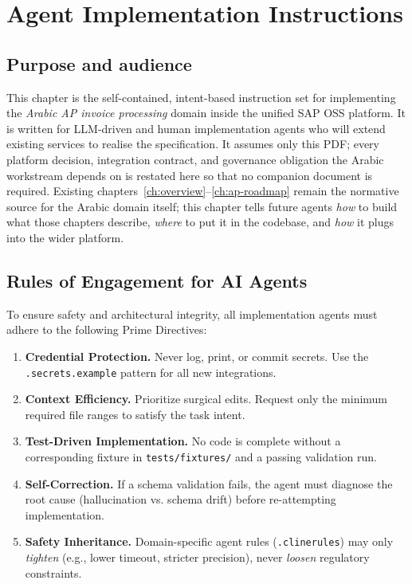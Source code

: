 \documentclass[11pt,a4paper,twoside]{report}
\begin{document}
\chapter{Agent Implementation Instructions}\label{ch:agent-impl}

\section{Purpose and audience}
This chapter is the self-contained, intent-based instruction set for
implementing the \emph{Arabic AP invoice processing} domain inside the
unified SAP OSS platform. It is written for LLM-driven and human
implementation agents who will extend existing services to realise the
specification. It assumes only this PDF; every platform decision,
integration contract, and governance obligation the Arabic workstream
depends on is restated here so that no companion document is required.
Existing chapters~\ref{ch:overview}--\ref{ch:ap-roadmap} remain the
normative source for the Arabic domain itself; this chapter tells
future agents \emph{how} to build what those chapters describe,
\emph{where} to put it in the codebase, and \emph{how} it plugs into
the wider platform.


\section{Rules of Engagement for AI Agents}
\label{sec:agent-rules}

To ensure safety and architectural integrity, all implementation agents must adhere to the following Prime Directives:

\begin{enumerate}[label=\textsc{rule}-\arabic*:, leftmargin=2cm]
\item \textbf{Credential Protection.} Never log, print, or commit secrets. Use the \texttt{.secrets.example} pattern for all new integrations.
\item \textbf{Context Efficiency.} Prioritize surgical edits. Request only the minimum required file ranges to satisfy the task intent.
\item \textbf{Test-Driven Implementation.} No code is complete without a corresponding fixture in \texttt{tests/fixtures/} and a passing validation run.
\item \textbf{Self-Correction.} If a schema validation fails, the agent must diagnose the root cause (hallucination vs. schema drift) before re-attempting implementation.
\item \textbf{Safety Inheritance.} Domain-specific agent rules (\texttt{.clinerules}) may only \emph{tighten} (e.g., lower timeout, stricter precision), never \emph{loosen} regulatory constraints.
\end{enumerate}
\end{document}
